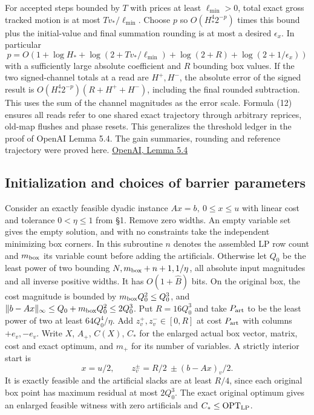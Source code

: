 \documentclass[11pt]{article}
\begin{document}
For accepted steps bounded by \(T\) with prices at least \(\ell_{\min}>0\), total exact gross tracked motion is at most \(T v_\ast/\ell_{\min}\). Choose \(p\) so \(O(H_\ast^4 2^{-p})\) times this bound plus the initial-value and final summation rounding is at most a desired \(\epsilon_x\). In particular
\[
 p=O\!\left(1+\log H_\ast+\log(2+T v_\ast/\ell_{\min})+\log(2+R)+\log(2+1/\epsilon_x)\right)
\tag{12}
\]
with a sufficiently large absolute coefficient and \(R\) bounding box values. If the two signed-channel totals at a read are \(H^+,H^-\), the absolute error of the signed result is \(O(H_\ast^4 2^{-p})(R+H^++H^-)\), including the final rounded subtraction. This uses the sum of the channel magnitudes as the error scale. Formula (12) ensures all reads refer to one shared exact trajectory through arbitrary reprices, old-map flushes and phase resets. This generalizes the threshold ledger in the proof of OpenAI Lemma 5.4. The gain summaries, rounding and reference trajectory were proved here. \href{https://raw.githubusercontent.com/openai/math/adc7f1241b42e322a6451854ab7e4b4c146bf78a/preprints/Almost-Linear-Time-Maximum-Cardinality-Matching-in-Sparse-General-Graphs-September-24-2026/main.pdf\#page=39}{OpenAI, Lemma 5.4}

\hypertarget{initialization-and-choices-of-barrier-parameters}{%
\subsection{Initialization and choices of barrier parameters}\label{initialization-and-choices-of-barrier-parameters}}

Consider an exactly feasible dyadic instance \(Ax=b,\ 0\le x\le u\) with linear cost and tolerance \(0<\eta\le1\) from §1. Remove zero widths. An empty variable set gives the empty solution, and with no constraints take the independent minimizing box corners. In this subroutine \(n\) denotes the assembled LP row count and \(m_{\rm box}\) its variable count before adding the artificials. Otherwise let \(Q_0\) be the least power of two bounding \(N,m_{\rm box}+n+1,1/\eta\), all absolute input magnitudes and all inverse positive widths. It has \(O(1+\widehat B)\) bits. On the original box, the cost magnitude is bounded by \(m_{\rm box}Q_0^2\le Q_0^3\), and \(\|b-Ax\|_\infty\le Q_0+m_{\rm box}Q_0^2\le2Q_0^3\). Put \(R=16Q_0^3\) and take \(P_{\rm art}\) to be the least power of two at least \(64Q_0^4/\eta\). Add \(z_v^+,z_v^-\in[0,R]\) at cost \(P_{\rm art}\) with columns \(+e_v,-e_v\). Write \(X\), \(A_+\), \(C(X)\), \(C_*\) for the enlarged actual box vector, matrix, cost and exact optimum, and \(m_+\) for its number of variables. A strictly interior start is
\[
 x=u/2,\qquad z_v^\pm=R/2\ \pm(b-Ax)_v/2 .
\]
It is exactly feasible and the artificial slacks are at least \(R/4\), since each original box point has maximum residual at most \(2Q_0^3\). The exact original optimum gives an enlarged feasible witness with zero artificials and \(C_*\le\mathrm{OPT}_{\rm LP}\).
\end{document}

